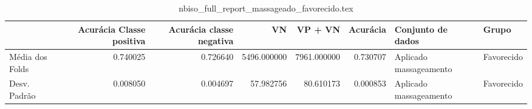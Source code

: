 \begin{table}
\centering
\caption{nbiso_full_report_massageado_favorecido.tex}
\label{nbiso_full_report_massageado_favorecido.tex}
\begin{tabular}{lrrrrrll}
\toprule
{}               &  Acurácia Classe positiva &  Acurácia classe negativa &          VN  &     VP + VN  &  Acurácia &       Conjunto de dados &       Grupo \\
\midrule
Média dos Folds &                  0.740025 &                  0.726640 &  5496.000000 &  7961.000000 &  0.730707 &  Aplicado massageamento &  Favorecido \\
Desv. Padrão    &                  0.008050 &                  0.004697 &    57.982756 &    80.610173 &  0.000853 &  Aplicado massageamento &  Favorecido \\
\bottomrule
\end{tabular}
\end{table}
